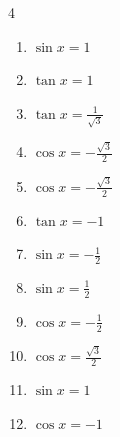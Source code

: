 \begin{multicols}{4}
\begin{enumerate}
  \item $\displaystyle \sin{x}  = 1$


\columnbreak %

  \item $\displaystyle \tan{x}  = 1$


  \item $\displaystyle \tan{x}  = \frac{1}{\sqrt{3}}$


  \item $\displaystyle \cos{x}  = -\frac{\sqrt{3}}{2}$


  \item $\displaystyle \cos{x}  = -\frac{\sqrt{3}}{2}$


  \item $\displaystyle \tan{x}  = -1$


  \item $\displaystyle \sin{x}  = -\frac{1}{2}$


  \item $\displaystyle \sin{x}  = \frac{1}{2}$


  \item $\displaystyle \cos{x}  = -\frac{1}{2}$


  \item $\displaystyle \cos{x}  = \frac{\sqrt{3}}{2}$


  \item $\displaystyle \sin{x}  = 1$


  \item $\displaystyle \cos{x}  = -1$


\end{enumerate}
\end{multicols}
